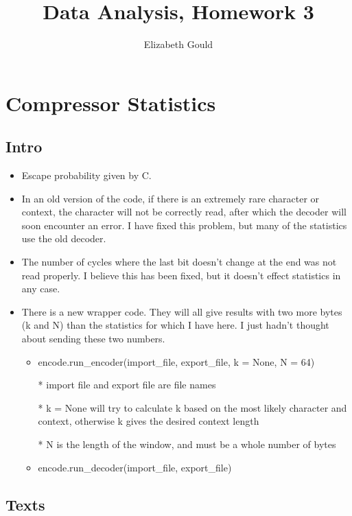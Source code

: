 \documentclass{article}
\title{Data Analysis, Homework 3}
\author{Elizabeth Gould}
\begin{document}
\maketitle

\section{Compressor Statistics}

\subsection{Intro}

\begin{itemize}
\item Escape probability given by C.
\item In an old version of the code, if there is an extremely rare character or context, the character will not be correctly read, after which the decoder will soon encounter an error. I have fixed this problem, but many of the statistics use the old decoder. 
\item The number of cycles where the last bit doesn't change at the end was not read properly. I believe this has been fixed, but it doesn't effect statistics in any case.
\item There is a new wrapper code. They will all give results with two more bytes (k and N) than the statistics for which I have here. I just hadn't thought about sending these two numbers. 
\begin{itemize}
\item encode.run\_encoder(import\_file, export\_file, k = None, N = 64)
\item[*] import file and export file are file names
\item[*] k = None will try to calculate k based on the most likely character and context, otherwise k gives the desired context length
\item[*] N is the length of the window, and must be a whole number of bytes
\item encode.run\_decoder(import\_file, export\_file)
\end{itemize}
\end{itemize}

\subsection{Texts} 
\end{document}
